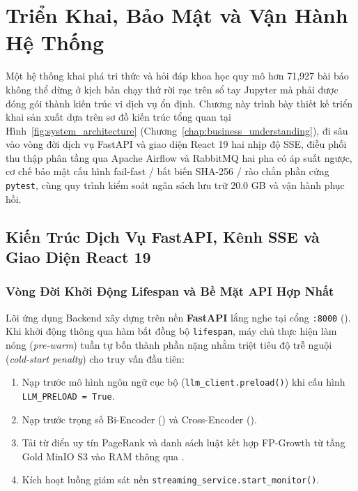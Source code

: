 
\chapter{Triển Khai, Bảo Mật và Vận Hành Hệ Thống}
\label{chap:deployment}

Một hệ thống khai phá tri thức và hỏi đáp khoa học quy mô hơn 71,927 bài báo không thể dừng ở kịch bản chạy thử rời rạc trên sổ tay Jupyter mà phải được đóng gói thành kiến trúc vi dịch vụ ổn định. Chương này trình bày thiết kế triển khai sản xuất dựa trên sơ đồ kiến trúc tổng quan tại Hình~\ref{fig:system_architecture} (Chương~\ref{chap:business_understanding}), đi sâu vào vòng đời dịch vụ FastAPI và giao diện React 19 hai nhịp độ SSE, điều phối thu thập phân tầng qua Apache Airflow và RabbitMQ hai pha có áp suất ngược, cơ chế bảo mật cấu hình fail-fast / bất biến SHA-256 / rào chắn phần cứng \texttt{pytest}, cùng quy trình kiểm soát ngân sách lưu trữ 20.0 GB và vận hành phục hồi.

\section{Kiến Trúc Dịch Vụ FastAPI, Kênh SSE và Giao Diện React 19}
\label{sec:ch6_backend_frontend}

\subsection{Vòng Đời Khởi Động Lifespan và Bề Mặt API Hợp Nhất}
\label{sec:ch6_lifespan_api}

Lõi ứng dụng Backend xây dựng trên nền \textbf{FastAPI} lắng nghe tại cổng \texttt{:8000} (). Khi khởi động thông qua hàm bất đồng bộ \texttt{lifespan}, máy chủ thực hiện làm nóng (\textit{pre-warm}) tuần tự bốn thành phần nặng nhằm triệt tiêu độ trễ nguội (\textit{cold-start penalty}) cho truy vấn đầu tiên:
\begin{enumerate}[label=\textbf{\arabic*.}]
  \item Nạp trước mô hình ngôn ngữ cục bộ (\texttt{llm\_client.preload()}) khi cấu hình \texttt{LLM\_PRELOAD = True}.
  \item Nạp trước trọng số Bi-Encoder  () và Cross-Encoder ().
  \item Tải từ điển uy tín PageRank và danh sách luật kết hợp FP-Growth từ tầng Gold MinIO S3 vào RAM thông qua .
  \item Kích hoạt luồng giám sát nền \texttt{streaming\_service.start\_monitor()}.
\end{enumerate}

